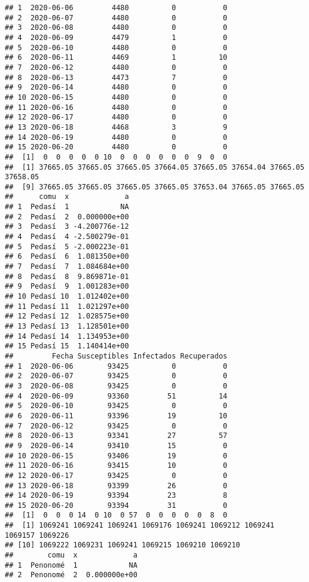 \documentclass[
]{article}
\begin{document}
\begin{verbatim}
## 1  2020-06-06         4480          0           0
## 2  2020-06-07         4480          0           0
## 3  2020-06-08         4480          0           0
## 4  2020-06-09         4479          1           0
## 5  2020-06-10         4480          0           0
## 6  2020-06-11         4469          1          10
## 7  2020-06-12         4480          0           0
## 8  2020-06-13         4473          7           0
## 9  2020-06-14         4480          0           0
## 10 2020-06-15         4480          0           0
## 11 2020-06-16         4480          0           0
## 12 2020-06-17         4480          0           0
## 13 2020-06-18         4468          3           9
## 14 2020-06-19         4480          0           0
## 15 2020-06-20         4480          0           0
##  [1]  0  0  0  0  0 10  0  0  0  0  0  0  9  0  0
##  [1] 37665.05 37665.05 37665.05 37664.05 37665.05 37654.04 37665.05 37658.05
##  [9] 37665.05 37665.05 37665.05 37665.05 37653.04 37665.05 37665.05
##      comu  x             a
## 1  Pedasí  1            NA
## 2  Pedasí  2  0.000000e+00
## 3  Pedasí  3 -4.200776e-12
## 4  Pedasí  4 -2.500279e-01
## 5  Pedasí  5 -2.000223e-01
## 6  Pedasí  6  1.081350e+00
## 7  Pedasí  7  1.084684e+00
## 8  Pedasí  8  9.869871e-01
## 9  Pedasí  9  1.001283e+00
## 10 Pedasí 10  1.012402e+00
## 11 Pedasí 11  1.021297e+00
## 12 Pedasí 12  1.028575e+00
## 13 Pedasí 13  1.128501e+00
## 14 Pedasí 14  1.134953e+00
## 15 Pedasí 15  1.140414e+00
##         Fecha Susceptibles Infectados Recuperados
## 1  2020-06-06        93425          0           0
## 2  2020-06-07        93425          0           0
## 3  2020-06-08        93425          0           0
## 4  2020-06-09        93360         51          14
## 5  2020-06-10        93425          0           0
## 6  2020-06-11        93396         19          10
## 7  2020-06-12        93425          0           0
## 8  2020-06-13        93341         27          57
## 9  2020-06-14        93410         15           0
## 10 2020-06-15        93406         19           0
## 11 2020-06-16        93415         10           0
## 12 2020-06-17        93425          0           0
## 13 2020-06-18        93399         26           0
## 14 2020-06-19        93394         23           8
## 15 2020-06-20        93394         31           0
##  [1]  0  0  0 14  0 10  0 57  0  0  0  0  0  8  0
##  [1] 1069241 1069241 1069241 1069176 1069241 1069212 1069241 1069157 1069226
## [10] 1069222 1069231 1069241 1069215 1069210 1069210
##        comu  x             a
## 1  Penonomé  1            NA
## 2  Penonomé  2  0.000000e+00

\end{verbatim}
\end{document}
